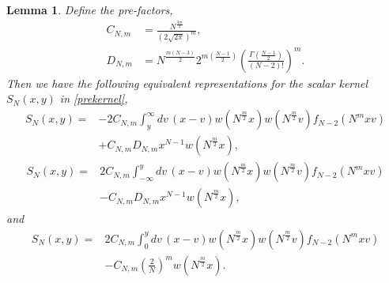 \documentclass[11pt,reqno]{amsproc}
\newtheorem{lemma}[theorem]{Lemma}
\numberwithin{equation}{section}
\numberwithin{theorem}{section}
\begin{document}
\begin{lemma}
\label{lem:kernrep}
Define the pre-factors,
\begin{equation}
\begin{split}
C_{N,m} &= \frac{N^{\frac{3m}{2}}}{(2\sqrt{2\pi})^{m}},\label{cnmdef}\\
D_{N,m} &= N^{\frac{m(N-3)}{2}}2^{m\left(\frac{N-1}{2}\right)}\left(\frac{\Gamma\left(\frac{N-1}{2}\right)}{(N-2)!}\right)^{m}.
\end{split}
\end{equation}
Then we have the following equivalent representations for the scalar kernel $S_{N}(x,y)$ in \eqref{prekernel},
\begin{equation}
\begin{split}
S_{N}(x,y) = &-2C_{N,m}\int_{y}^{\infty}dv\,(x-v)w(N^{\frac{m}{2}}x)w(N^{\frac{m}{2}}v)f_{N-2}(N^{m}xv)\\
&+C_{N,m}D_{N,m}x^{N-1}w(N^{\frac{m}{2}}x),\label{Srep1}
\end{split}
\end{equation}
\begin{equation}
\begin{split}
S_{N}(x,y) = &2C_{N,m}\int_{-\infty}^{y}dv\,(x-v)w(N^{\frac{m}{2}}x)w(N^{\frac{m}{2}}v)f_{N-2}(N^{m}xv)\\
&-C_{N,m}D_{N,m}x^{N-1}w(N^{\frac{m}{2}}x), \label{Srep2}
\end{split}
\end{equation}
and
\begin{equation}
\begin{split}
S_{N}(x,y) = &2C_{N,m}\int_{0}^{y}dv\,(x-v)w(N^{\frac{m}{2}}x)w(N^{\frac{m}{2}}v)f_{N-2}(N^{m}xv)\\
&-C_{N,m}\left(\frac{2}{N}\right)^{m}w(N^{\frac{m}{2}}x).\label{Srep3}
\end{split}
\end{equation}
\end{lemma}
\end{document}
